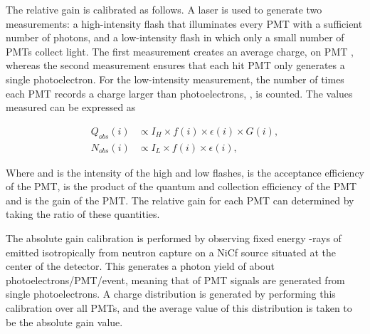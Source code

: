 The relative gain is calibrated as follows. A laser is used to generate two measurements: a high-intensity flash that illuminates every PMT with a sufficient number of photons, and a low-intensity flash in which only a small number of PMTs collect light. The first measurement creates an average charge,  on PMT , whereas the second measurement ensures that each hit PMT only generates a single photoelectron. For the low-intensity measurement, the number of times each PMT records a charge larger than  photoelectrons, , is counted. The values measured can be expressed as

\begin{equation}
  \label{eq:T2KSKExp_RelativeGainCalib}
  \begin{split}
    Q_{obs}(i) &\propto I_{H} \times f(i) \times \epsilon(i) \times G(i), \\
    N_{obs}(i) &\propto I_{L} \times f(i) \times \epsilon(i),
  \end{split}
\end{equation}

Where  and  is the intensity of the high and low flashes,  is the acceptance efficiency of the  PMT,  is the product of the quantum and collection efficiency of the  PMT and  is the gain of the 	PMT. The relative gain for each PMT can determined by taking the ratio of these quantities.

The absolute gain calibration is performed by observing fixed energy \quickmath{\gamma}-rays of  emitted isotropically from neutron capture on a NiCf source situated at the center of the detector. This generates a photon yield of about  photoelectrons/PMT/event, meaning that  of PMT signals are generated from single photoelectrons. A charge distribution is generated by performing this calibration over all PMTs, and the average value of this distribution is taken to be the absolute gain value.


